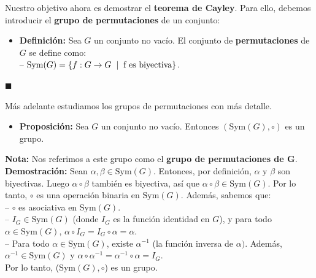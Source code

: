 \documentclass[10 pt]{article}
\begin{document}
\Large{Nuestro objetivo ahora es demostrar el \textbf{teorema de Cayley}. Para ello, debemos introducir el \textbf{grupo de permutaciones} de un conjunto:} \\

\begin{itemize}
    \item \Large{\textbf{Definición:} Sea $G$ un conjunto no vacío. El conjunto de \textbf{permutaciones} de $G$ se define como: \\

    -- $\text{Sym}(G)=\{f:G \rightarrow G \hspace{0.2 cm}|\hspace{0.2 cm}\text{f es biyectiva}\}$.} \\
\end{itemize}

\begin{flushright}
    $\blacksquare$
\end{flushright}

\Large{Más adelante estudiamos los grupos de permutaciones con más detalle.} \\

\begin{itemize}
    \item \Large{\textbf{Proposición:} Sea $G$ un conjunto no vacío. Entonces $(\text{Sym}(G),\circ)$ es un grupo.} \\
\end{itemize}

\Large{\textbf{Nota:} Nos referimos a este grupo como el \textbf{grupo de permutaciones de G}.} \\

\Large{\textbf{Demostración:} Sean $\alpha,\beta \in \text{Sym}(G)$. Entonces, por definición, $\alpha$ y $\beta$ son biyectivas. Luego $\alpha \circ \beta$ también es biyectiva, así que $\alpha \circ \beta \in \text{Sym}(G)$. Por lo tanto, $\circ$ es una operación binaria en $\text{Sym}(G)$. Además, sabemos que: \\

-- $\circ$ es asociativa en $\text{Sym}(G)$. \\

-- $I_G \in \text{Sym}(G)$ (donde $I_G$ es la función identidad en $G$), y para todo $\alpha \in \text{Sym}(G)$, $\alpha \circ I_G=I_G \circ \alpha=\alpha$. \\

-- Para todo $\alpha \in \text{Sym}(G)$, existe $\alpha^{-1}$ (la función inversa de $\alpha)$. Además, $\alpha^{-1} \in \text{Sym}(G)$ y $\alpha \circ \alpha^{-1}=\alpha^{-1} \circ \alpha=I_G$. \\

Por lo tanto, ($\text{Sym}(G),\circ$) es un grupo.} \\
\end{document}
